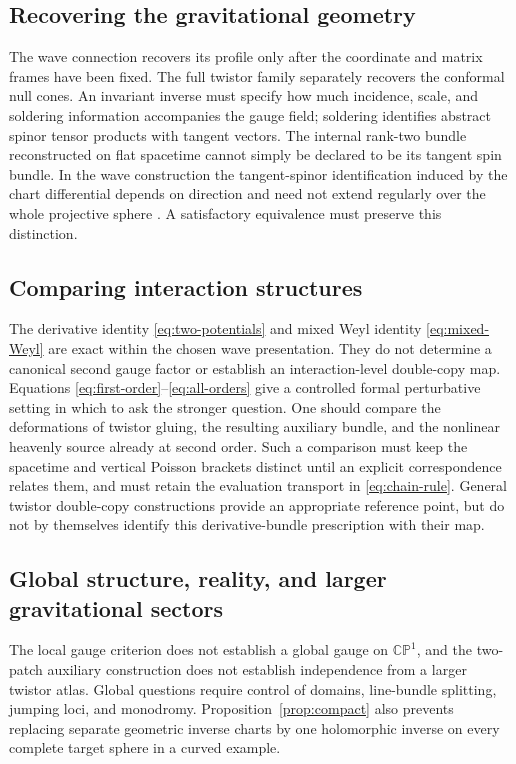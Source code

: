 \documentclass[11pt]{article}
\numberwithin{equation}{section}
\theoremstyle{definition}
\theoremstyle{remark}
\newcommand{\CP}{\mathbb{CP}}
\begin{document}
\subsection{Recovering the gravitational geometry}

The wave connection recovers its profile only after the coordinate and matrix frames have been fixed. The full twistor family separately recovers the conformal null cones. An invariant inverse must specify how much incidence, scale, and soldering information accompanies the gauge field; soldering identifies abstract spinor tensor products with tangent vectors. The internal rank-two bundle reconstructed on flat spacetime cannot simply be declared to be its tangent spin bundle. In the wave construction the tangent-spinor identification induced by the chart differential depends on direction and need not extend regularly over the whole projective sphere \cite{BakerWave}. A satisfactory equivalence must preserve this distinction.

\subsection{Comparing interaction structures}

The derivative identity \eqref{eq:two-potentials} and mixed Weyl identity \eqref{eq:mixed-Weyl} are exact within the chosen wave presentation. They do not determine a canonical second gauge factor or establish an interaction-level double-copy map. Equations \eqref{eq:first-order}--\eqref{eq:all-orders} give a controlled formal perturbative setting in which to ask the stronger question. One should compare the deformations of twistor gluing, the resulting auxiliary bundle, and the nonlinear heavenly source already at second order. Such a comparison must keep the spacetime and vertical Poisson brackets distinct until an explicit correspondence relates them, and must retain the evaluation transport in \eqref{eq:chain-rule}. General twistor double-copy constructions \cite{Borsten} provide an appropriate reference point, but do not by themselves identify this derivative-bundle prescription with their map.

\subsection{Global structure, reality, and larger gravitational sectors}

The local gauge criterion does not establish a global gauge on $\CP^1$, and the two-patch auxiliary construction does not establish independence from a larger twistor atlas. Global questions require control of domains, line-bundle splitting, jumping loci, and monodromy. Proposition~\ref{prop:compact} also prevents replacing separate geometric inverse charts by one holomorphic inverse on every complete target sphere in a curved example.
\end{document}
